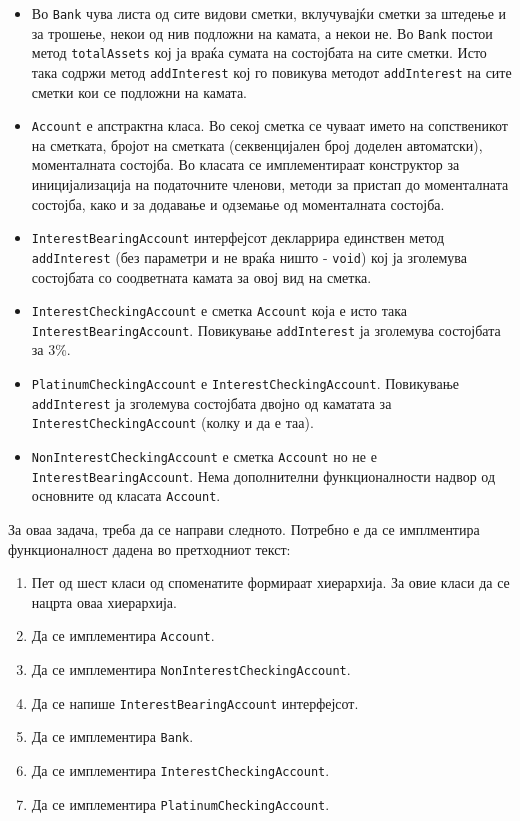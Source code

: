 \begin{questions}
\begin{itemize}
  \item Во \texttt{Bank} чува листа од сите видови сметки, вклучувајќи сметки
  за штедење и за трошење, некои од нив подложни на камата, а некои не. Во
  \texttt{Bank} постои метод \texttt{totalAssets} кој ја враќа сумата на
  состојбата на сите сметки. Исто така содржи метод \texttt{addInterest} кој го
  повикува методот \texttt{addInterest} на сите сметки кои се подложни на
  камата.
  \item \texttt{Account} е апстрактна класа. Во секој сметка се чуваат името на
  сопственикот на сметката, бројот на сметката (секвенцијален број доделен
  автоматски), моменталната состојба. Во класата се имплементираат конструктор
  за иницијализација на податочните членови, методи за пристап до моменталната
  состојба, како и за додавање и одземање од моменталната состојба.
  \item \texttt{InterestBearingAccount} интерфејсот декларрира единствен метод
  \texttt{addInterest} (без параметри и не враќа ништо - \texttt{void}) кој ја зголемува
  состојбата со соодветната камата за овој вид на сметка.
  \item \texttt{InterestCheckingAccount} е сметка \texttt{Account} која е исто
  така \texttt{InterestBearingAccount}. Повикување \texttt{addInterest} ја
  зголемува состојбата за 3\%.
	\item \texttt{PlatinumCheckingAccount} е \texttt{InterestCheckingAccount}.
Повикување \texttt{addInterest} ја зголемува состојбата двојно од каматата за
\texttt{InterestCheckingAccount} (колку и да е таа).
\item \texttt{NonInterestCheckingAccount} е сметка \texttt{Account} но не е
\texttt{InterestBearingAccount}. Нема дополнителни функционалности надвор од
основните од класата \texttt{Account}.
\end{itemize}
За оваа задача, треба да се направи следното. Потребно е да се имплментира
функционалност дадена во претходниот текст:
\renewcommand{\theenumi}{\alph{enumi}}
\renewcommand{\labelenumi}{\theenumi}
\begin{enumerate}
  \item Пет од шест класи од споменатите формираат хиерархија. За овие класи да
  се нацрта оваа хиерархија.
  \item Да се имплементира \texttt{Account}.
  \item Да се имплементира \texttt{NonInterestCheckingAccount}.
  \item Да се напише \texttt{InterestBearingAccount} интерфејсот.
  \item Да се имплементира \texttt{Bank}.
  \item Да се имплементира \texttt{InterestCheckingAccount}.
  \item Да се имплементира \texttt{PlatinumCheckingAccount}.  
\end{enumerate}


\end{questions}
